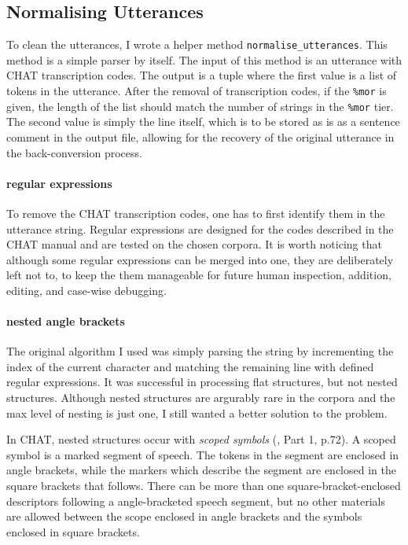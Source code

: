 \subsection{Normalising Utterances}

To clean the utterances, I wrote a helper method \texttt{normalise\_utterances}. This method is a simple parser by itself. The input of this method is an utterance with CHAT transcription codes. The output is a tuple where the first value is a list of tokens in the utterance. After the removal of transcription codes, if the \texttt{\%mor} is given, the length of the list should match the number of strings in the \texttt{\%mor} tier. The second value is simply the line itself, which is to be stored as is as a sentence comment  in the output file, allowing for the recovery of the original utterance in the back-conversion process.

\paragraph{regular expressions} To remove the CHAT transcription codes, one has to first identify them in the utterance string. Regular expressions are designed for the codes described in the CHAT manual and are tested on the chosen corpora. It is worth noticing that although some regular expressions can be merged into one, they are deliberately left not to, to keep the them manageable for future human inspection, addition, editing, and case-wise debugging.

\paragraph{nested angle brackets} The original algorithm I used was simply parsing the string by incrementing the index of the current character and matching the remaining line with defined regular expressions. It was successful in processing flat structures, but not nested structures. Although nested structures are argurably rare in the corpora and the max level of nesting is just one, I still wanted a better solution to the problem.

In CHAT, nested structures occur with \emph{scoped symbols} (\cite{Macwhinney2000}, Part 1, p.72). A scoped symbol is a marked segment of speech. The tokens in the segment are enclosed in angle brackets, while the markers which describe the segment are enclosed in the square brackets that follows. There can be more than one square-bracket-enclosed descriptors following a angle-bracketed speech segment, but no other materials are allowed between the scope enclosed in angle brackets and the symbols enclosed in square brackets.

